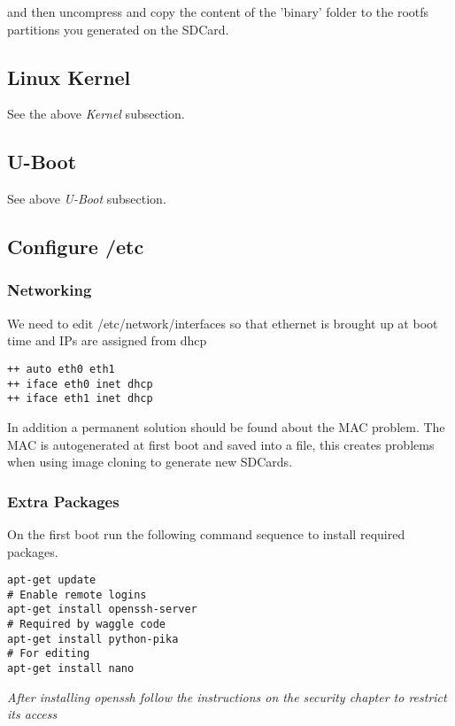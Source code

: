 and then uncompress and copy the content of the 'binary' folder to the rootfs partitions you generated on the SDCard.

\subsection{Linux Kernel}

See the above \textit{Kernel} subsection.

\subsection{U-Boot}

See above \textit{U-Boot} subsection.

\subsection{Configure /etc}

\subsubsection{Networking}

We need to edit /etc/network/interfaces so that ethernet is brought up at boot time and IPs are assigned from dhcp

\begin{lstlisting}
++ auto eth0 eth1
++ iface eth0 inet dhcp
++ iface eth1 inet dhcp
\end{lstlisting}

In addition a permanent solution should be found about the MAC problem. The MAC is autogenerated at first boot and saved into a file, this creates problems when using image cloning to generate new SDCards.


\subsubsection{Extra Packages}

On the first boot run the following command sequence to install required packages.
\begin{lstlisting}
apt-get update
# Enable remote logins
apt-get install openssh-server
# Required by waggle code
apt-get install python-pika 
# For editing
apt-get install nano
\end{lstlisting}

\noindent
\textit{After installing openssh follow the instructions on the security chapter to restrict its access}

